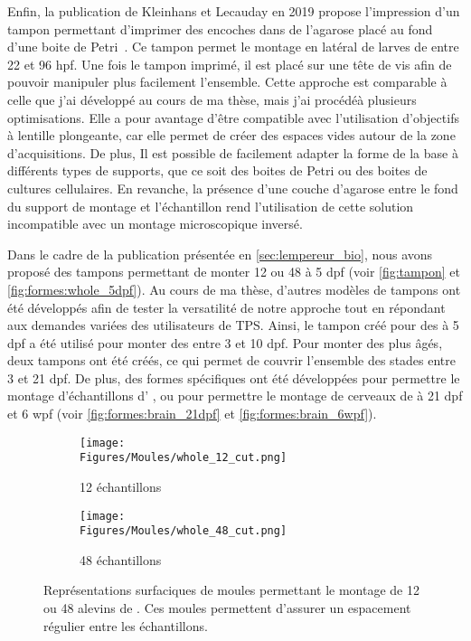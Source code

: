 \documentclass[\main/main.tex]{subfiles}
\begin{document}
Enfin, la publication de Kleinhans et Lecauday en 2019 propose l'impression d'un tampon permettant d'imprimer des encoches dans de l'agarose placé au fond d'une boite de Petri~\cite{kleinhans_2019}.
%
Ce tampon permet le montage en latéral de larves de \pz entre 22 et 96 hpf.
%
Une fois le tampon imprimé, il est placé sur une tête de vis afin de pouvoir manipuler plus facilement l'ensemble.
%
Cette approche est comparable à celle que j'ai développé au cours de ma thèse, mais j'ai procédéà plusieurs optimisations.
%
Elle a pour avantage d'être compatible avec l'utilisation d'objectifs à lentille plongeante, car elle permet de créer des espaces vides autour de la zone d'acquisitions.
%
De plus, Il est possible de facilement adapter la forme de la base à différents types de supports, que ce soit des boites de Petri ou des boites de cultures cellulaires.
%
En revanche, la présence d'une couche d'agarose entre le fond du support de montage et l'échantillon rend l'utilisation de cette solution incompatible avec un montage microscopique inversé.

% 
Dans le cadre de la publication présentée en \autoref{sec:lempereur_bio},
nous avons proposé des tampons permettant de monter 12 ou 48 \pzs{} à 5 dpf 
(voir \autoref{fig:tampon} et \autoref{fig:formes:whole_5dpf}).
%
Au cours de ma thèse, d'autres modèles de tampons ont été développés afin de tester la versatilité de notre approche tout en répondant aux demandes variées des utilisateurs de TPS.
%
Ainsi, le tampon créé pour des \pzs{} à 5 dpf a été utilisé pour monter des \pzs{} entre 3 et 10 dpf.
%
Pour monter des \pzs{} plus âgés, deux tampons ont été créés, ce qui permet de
couvrir l'ensemble des stades entre 3 et 21 dpf.
%
De plus, des formes spécifiques ont été développées pour permettre le montage d'échantillons
d' \ol{}, ou pour permettre le montage de cerveaux de \pz{} à 21 dpf et 6 wpf
(voir \autoref{fig:formes:brain_21dpf} et \autoref{fig:formes:brain_6wpf}).

\begin{figure}[htbp]
    \centering
    \begin{subfigure}[b]{0.57\textwidth}
       \caption{
            \label{fig:tampon:12}
            12 échantillons
            }
       \centering \texttt{[image: \\Figures/Moules/whole\_12\_cut.png]}
    \end{subfigure}
    \begin{subfigure}[b]{0.38\textwidth}
       \caption{
        \label{fig:tampon:48}
        48 échantillons
        }
       \centering \texttt{[image: \\Figures/Moules/whole\_48\_cut.png]}
    \end{subfigure}
    \caption{
        \label{fig:tampon}
        Représentations surfaciques de moules permettant le montage de 12 ou 48 alevins de \pzs{}.
        Ces moules permettent d'assurer un espacement régulier entre les échantillons.
    }
    
\end{figure}
\end{document}
